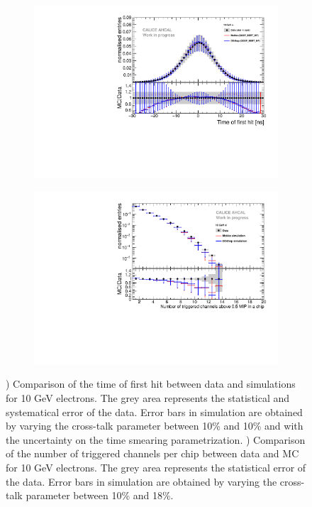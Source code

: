 \begin{figure}[htbp!]
	\centering
	\begin{subfigure}[t]{0.49\textwidth}
		\includegraphics[width=1\textwidth]{../Thesis_Plots/Timing/Electrons/Plots/Comparison_SimData_Electrons10GeV.pdf}
		\caption{}\label{fig:elec_sim_data_10GeV}
	\end{subfigure}
	\hfill
	\begin{subfigure}[t]{0.49\textwidth}
		\includegraphics[width=1\textwidth]{../Thesis_Plots/Timing/Electrons/Plots/Comparison_SimData_Electrons_nHits_10GeV.pdf}
		\caption{}\label{fig:elec_sim_data_nHits_10GeV}
	\end{subfigure}
	\caption{) Comparison of the time of first hit between data and simulations for 10 GeV electrons. The grey area represents the statistical and systematical error of the data. Error bars in simulation are obtained by varying the cross-talk parameter between 10\% and 10\% and with the uncertainty on the time smearing parametrization. ) Comparison of the number of triggered channels per chip between data and MC for 10 GeV electrons. The grey area represents the statistical error of the data. Error bars in simulation are obtained by varying the cross-talk parameter between 10\% and 18\%.}
\end{figure}

